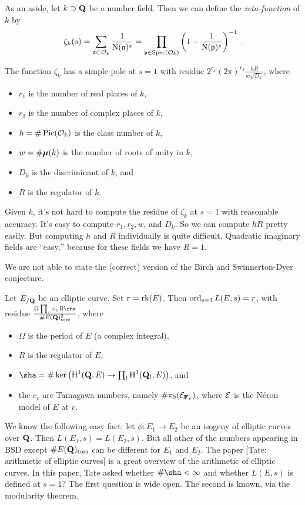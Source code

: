 As an aside, let $k\supset \mathbf{Q}$ be a number field. Then we can define the 
\emph{zeta-function} of $k$ by 
\[
  \zeta_k(s) = \sum_{\mathfrak{a}\subset \mathcal{O}_k} \frac{1}{\operatorname{N}(\mathfrak{a})^s} = \prod_{\mathfrak{p}\in\operatorname{Spec}(\mathcal{O}_k)} \left(1-\frac{1}{\operatorname{N}(\mathfrak{p})^s}\right)^{-1} .
\]
\begin{theorem}
The function $\zeta_k$ has a simple pole at $s=1$ with residue 
$2^{r_1} (2\pi)^{r_2} \frac{h R}{w\sqrt{D_k}}$, where 
\begin{itemize}
\item $r_1$ is the number of real places of $k$, 
\item $r_2$ is the number of complex places of $k$, 
\item $h=\# \operatorname{Pic}(\mathcal{O}_k)$ is the class number of $k$, 
\item $w=\# {\bm\mu}(k)$ is the number of roots of unity in $k$, 
\item $D_k$ is the discriminant of $k$, and 
\item $R$ is the regulator of $k$. 
\end{itemize}
\end{theorem}

Given $k$, it's not hard to compute the residue of $\zeta_k$ at $s=1$ with 
reasonable accuracy. It's easy to compute $r_1,r_2,w$, and $D_k$. So we can 
compute $h R$ pretty easily. But computing $h$ and $R$ individually is quite 
difficult. Quadratic imaginary fields are ``easy,'' because for these fields 
we have $R=1$. 

We are not able to state the (correct) version of the Birch and Swinnerton-Dyer 
conjecture. 

\begin{conjecture}
Let $E_{/\mathbf{Q}}$ be an elliptic curve. Set $r=\operatorname{rk}(E)$. Then 
$\operatorname{ord}_{s=1} L(E,s) = r$, with residue 
$\frac{\Omega \prod_v c_v R \sha}{\# E(\dQ)_\mathrm{tors}^2}$, where 
\begin{itemize}
\item $\Omega$ is the period of $E$ (a complex integral), 
\item $R$ is the regulator of $E$, 
\item $\sha=\#\ker\left(\h^1(\dQ,E)\to \prod_l \h^1(\dQ_l,E)\right)$, and 
\item the $c_v$ are Tamagawa numbers, namely $\#\pi_0(\mathcal{E}_{\mathbf{F}_v})$, where 
$\mathcal{E}$ is the N\'eron model of $E$ at $v$. 
\end{itemize}
\end{conjecture}

We know the following easy fact: let $\phi:E_1\to E_2$ be an isogeny of 
elliptic curves over $\mathbf{Q}$. Then $L(E_1,s)=L(E_2,s)$. But all other 
of the numbers appearing in BSD except $\# E(\mathbf{Q})_\mathrm{tors}$ can be 
different for $E_1$ and $E_2$. The paper [Tate: arithmetic of elliptic 
curves] is a great overview of the arithmetic of elliptic curves. In this 
paper, Tate asked whether $\# \sha<\infty$ and whether $L(E,s)$ is defined at 
$s=1$? The first question is wide open. The second is known, via the 
modularity theorem. 

